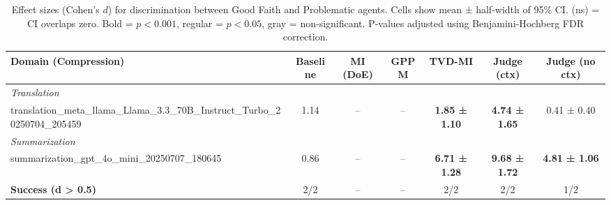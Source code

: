 \begin{table}[t]
\centering
\caption{Effect sizes (Cohen's $d$) for discrimination between Good Faith and Problematic agents. Cells show mean ± half-width of 95\% CI. (ns) = CI overlaps zero. Bold = $p<0.001$, regular = $p<0.05$, gray = non-significant. P-values adjusted using Benjamini-Hochberg FDR correction.}
\label{tab:effect_sizes}
\footnotesize
\begin{tabular}{@{}lcccccc@{}}
\toprule
\textbf{Domain (Compression)} & \textbf{Baseline} & \textbf{MI (DoE)} & \textbf{GPPM} & \textbf{TVD-MI} & \textbf{Judge (ctx)} & \textbf{Judge (no ctx)} \\
\midrule
\multicolumn{7}{l}{\textit{Translation}} \\
translation_meta_llama_Llama_3.3_70B_Instruct_Turbo_20250704_205459 & 1.14 & -- & -- & \textbf{1.85 ± 1.10} & \textbf{4.74 ± 1.65} & 0.41 ± 0.40 \\
\midrule
\multicolumn{7}{l}{\textit{Summarization}} \\
summarization_gpt_4o_mini_20250707_180645 & 0.86 & -- & -- & \textbf{6.71 ± 1.28} & \textbf{9.68 ± 1.72} & \textbf{4.81 ± 1.06} \\
\midrule
\midrule
\textbf{Success (d > 0.5)} & 2/2 & -- & -- & 2/2 & 2/2 & 1/2 \\
\bottomrule
\end{tabular}
\end{table}